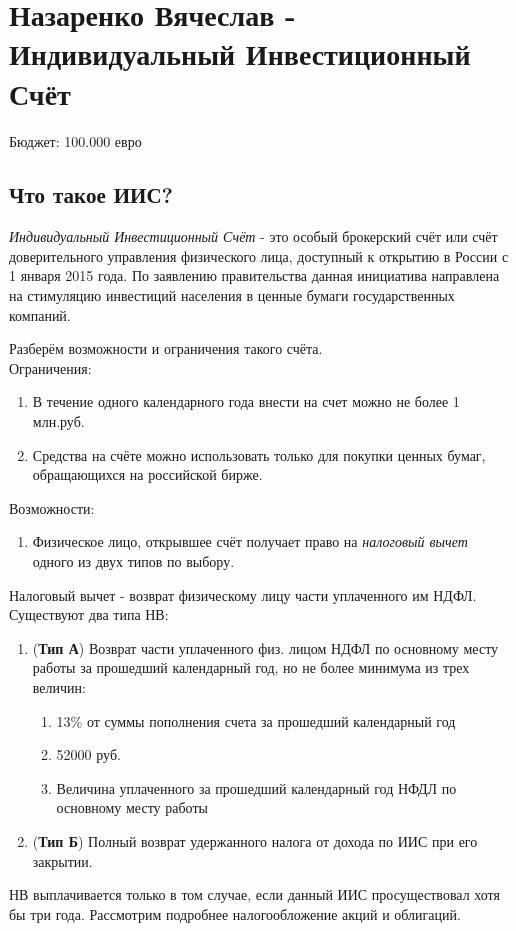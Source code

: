 \section{Назаренко Вячеслав - Индивидуальный Инвестиционный Счёт}
Бюджет: 100.000 евро \\


\subsection{Что такое ИИС?}

\textit{Индивидуальный Инвестиционный Счёт} - это особый брокерский счёт или счёт доверительного управления физического лица, доступный к открытию в России с 1 января 2015 года. По заявлению правительства данная инициатива направлена на стимуляцию инвестиций населения в ценные бумаги государственных компаний.

Разберём возможности и ограничения такого счёта.\\
Ограничения:
\begin{enumerate}
    \item В течение одного календарного года внести на счет можно не более 1 млн.руб.
    \item Средства на счёте можно использовать только для покупки ценных бумаг, обращающихся на российской бирже.
\end{enumerate}
Возможности:
\begin{enumerate}
    \item Физическое лицо, открывшее счёт получает право на \textit{налоговый вычет} одного из двух типов по выбору.
\end{enumerate}

Налоговый вычет - возврат  физическому лицу части уплаченного им НДФЛ. Существуют два типа НВ:
\begin{enumerate}
    \item (\textbf{Тип А}) Возврат части уплаченного физ. лицом НДФЛ по основному месту работы за прошедший календарный год, но не более минимума из трех величин:
    \begin{enumerate}
        \item 13\% от суммы пополнения счета за прошедший календарный год
        \item 52000 руб.
        \item Величина уплаченного за прошедший календарный год НФДЛ по основному месту работы
    \end{enumerate}
    \item (\textbf{Тип Б}) Полный возврат удержанного налога от дохода по ИИС при его закрытии.
\end{enumerate}
НВ выплачивается только в том случае, если данный ИИС просуществовал хотя бы три года. Рассмотрим подробнее налогообложение акций и облигаций.
